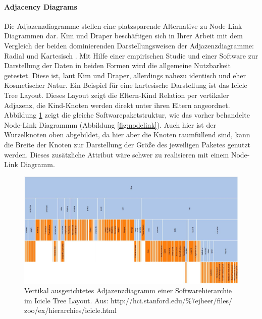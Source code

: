 \documentclass[draft=false
              ,paper=a4
              ,twoside=false
              ,fontsize=11pt
              ,headsepline
              ,BCOR10mm
              ,DIV11
              ]{scrbook}
\begin{document}
\paragraph{Adjacency Diagrams} %
\label{par:adjacency_diagrams}
Die Adjazenzdiagramme stellen eine platzsparende Alternative zu Node-Link Diagrammen dar. Kim und Draper beschäftigen sich in Ihrer Arbeit mit dem Vergleich der beiden dominierenden Darstellungsweisen der Adjazenzdiagramme: Radial und Kartesisch \cite{Kim:2014:RVC:2636240.2636871}. Mit Hilfe einer empirischen Studie und einer Software zur Darstellung der Daten in beiden Formen wird die allgemeine Nutzbarkeit getestet. Diese ist, laut Kim und Draper, allerdings nahezu identisch und eher Kosmetischer Natur. 
Ein Beispiel für eine kartesische Darstellung ist das Icicle Tree Layout. Dieses Layout zeigt die Eltern-Kind Relation per vertikaler Adjazenz, die Kind-Knoten werden direkt unter ihren Eltern angeordnet. Abbildung \ref{fig:icicle} zeigt die gleiche Softwarepaketstruktur, wie das vorher behandelte Node-Link Diagrammm (Abbildung \ref{fig:nodelink}). Auch hier ist der Wurzelknoten oben abgebildet, da hier aber die Knoten raumfüllend sind, kann die Breite der Knoten zur Darstellung der Größe des jeweiligen Paketes genutzt werden. Dieses zusätzliche Attribut wäre schwer zu realisieren mit einem Node-Link Diagramm.

\begin{figure}[htbp]
  \centering
  \includegraphics[width=\textwidth]{img/icicle}
  \caption{Vertikal ausgerichtetes Adjazenzdiagramm einer Softwarehierarchie im Icicle Tree Layout. Aus: http://hci.stanford.edu/\%7ejheer/files/ \newline zoo/ex/hierarchies/icicle.html}
  \label{fig:icicle}
 \end{figure}
\end{document}
